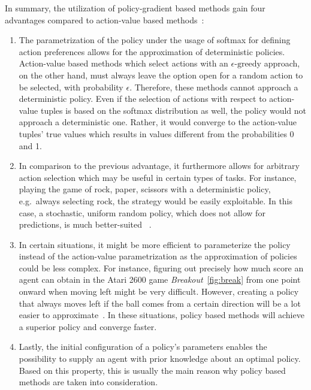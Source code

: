 \documentclass[draft,final]{vutinfth} %
\newcommand{\p}[1]{see p. #1}
\begin{document}
    In summary, the utilization of policy-gradient based methods gain four advantages compared to action-value based methods~\citep[\p{322f}]{sutton_reinforcement_2018}:

    \begin{enumerate}
        \item The parametrization of the policy under the usage of softmax for defining action preferences allows for the approximation of deterministic policies.
        Action-value based methods which select actions with an $\epsilon\text{-greedy}$ approach, on the other hand, must always leave the option open for a random action to be selected, with probability $\epsilon$.
        Therefore, these methods cannot approach a deterministic policy.
        Even if the selection of actions with respect to action-value tuples is based on the softmax distribution as well, the policy would not approach a deterministic one.
        Rather, it would converge to the action-value tuples' true values which results in values different from the probabilities 0 and 1.
        \item In comparison to the previous advantage, it furthermore allows for arbitrary action selection which may be useful in certain types of tasks.
        For instance, playing the game of rock, paper, scissors with a deterministic policy, e.g.\ always selecting rock, the strategy would be easily exploitable.
        In this case, a stochastic, uniform random policy, which does not allow for predictions, is much better-suited ~.
        \item In certain situations, it might be more efficient to parameterize the policy instead of the action-value parametrization as the approximation of policies could be less complex.
        For instance, figuring out precisely how much score an agent can obtain in the Atari 2600 game \textit{Breakout}~\eqref{fig:break} from one point onward when moving left might be very difficult.
        However, creating a policy that always moves left if the ball comes from a certain direction will be a lot easier to approximate~.
        In these situations, policy based methods will achieve a superior policy and converge faster\citep[\p{323}]{sutton_reinforcement_2018}.
        \item Lastly, the initial configuration of a policy's parameters enables the possibility to supply an agent with prior knowledge about an optimal policy.
        Based on this property, this is usually the main reason why policy based methods are taken into consideration.
    \end{enumerate}
\end{document}
